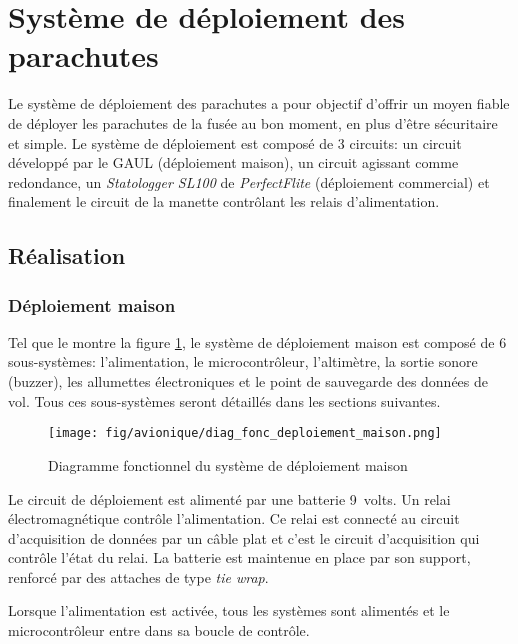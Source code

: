 \section{Système de déploiement des parachutes}
\label{chap:deploiement}

Le système de déploiement des parachutes a pour objectif d'offrir un moyen
fiable de déployer les parachutes de la fusée au bon moment, en plus d'être
sécuritaire et simple. Le système de déploiement est composé de 3 circuits: un
circuit développé par le GAUL (déploiement maison), un circuit agissant comme
redondance, un \textit{Statologger SL100} de \textit{PerfectFlite} (déploiement
commercial) et finalement le circuit de la manette contrôlant les relais
d'alimentation.

\subsection{Réalisation}

\subsubsection{Déploiement maison}


Tel que le montre la figure \ref{f:diag_fonc_deploiement_maison}, le système de
déploiement maison est composé de 6 sous-systèmes: l'alimentation, le
microcontrôleur, l'altimètre, la sortie sonore (buzzer), les allumettes
électroniques et le point de sauvegarde des données de vol. Tous ces
sous-systèmes seront détaillés dans les sections suivantes.

\begin{figure}[H]
	\center
	\texttt{[image: fig/avionique/diag\_fonc\_deploiement\_maison.png]}
	\caption{Diagramme fonctionnel du système de déploiement maison}
	\label{f:diag_fonc_deploiement_maison}
\end{figure}


Le circuit de déploiement est alimenté par une batterie 9~volts. Un relai
électromagnétique contrôle l'alimentation. Ce relai est connecté au circuit
d'acquisition de données par un câble plat et c'est le circuit d'acquisition
qui contrôle l'état du relai. La batterie est maintenue en place par son
support, renforcé par des attaches de type \textit{tie wrap}.
\\
\par
Lorsque l'alimentation est activée, tous les systèmes sont alimentés et le
microcontrôleur entre dans sa boucle de contrôle.

